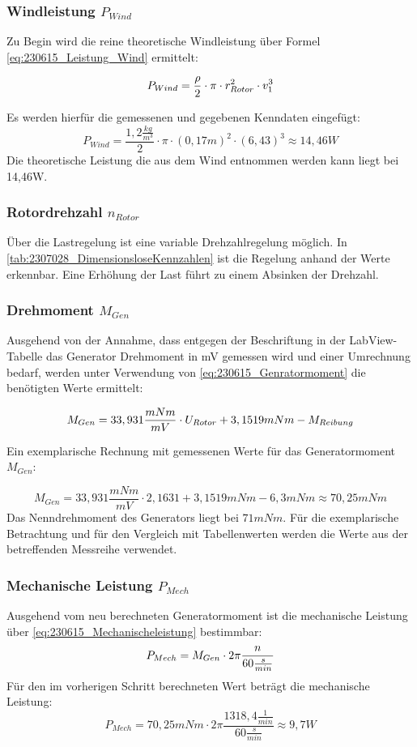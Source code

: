\subsubsection*{Windleistung $P_{Wind}$}
Zu Begin wird die reine theoretische Windleistung über Formel \autoref{eq:230615_Leistung_Wind} ermittelt:

\begin{equation}
    \centering
    P_{Wind} = \frac{\rho}{2} \cdot \pi \cdot r_{Rotor}^2 \cdot v_1^3
    \label{eq:230615_Leistung_Wind}
\end{equation}

Es werden hierfür die gemessenen und gegebenen Kenndaten eingefügt:
$$P_{Wind} = \frac{1,2 \frac{kg}{m^3}}{2} \cdot \pi \cdot (0,17 m)^2 \cdot (6,43)^3 \approx 14,46 W$$
Die theoretische Leistung die aus dem Wind entnommen werden kann liegt bei 14,46W.

\subsubsection*{Rotordrehzahl $n_{Rotor}$}
Über die Lastregelung ist eine variable Drehzahlregelung möglich. In \autoref{tab:2307028_DimensionsloseKennzahlen} ist die Regelung anhand der Werte erkennbar. Eine Erhöhung der Last führt zu einem Absinken der Drehzahl.
\subsubsection*{Drehmoment $M_{Gen}$}
Ausgehend von der Annahme,
 dass entgegen der Beschriftung in der LabView-Tabelle das Generator Drehmoment in mV gemessen wird und einer Umrechnung bedarf, 
 werden unter Verwendung von \autoref{eq:230615_Genratormoment} die benötigten Werte ermittelt:

\begin{equation}
    \centering
    M_{Gen} = 33,931\frac{mNm}{mV} \cdot U_{Rotor} + 3,1519 mNm - M_{Reibung}
    \label{eq:230615_Genratormoment}
\end{equation}

Ein exemplarische Rechnung mit gemessenen Werte für das Generatormoment $M_{Gen}$:

$$M_{Gen} = 33,931\frac{mNm}{mV} \cdot 2,1631 + 3,1519 mNm - 6,3mNm \approx 70,25 mNm$$
Das Nenndrehmoment des Generators liegt bei $71 mNm$. Für die exemplarische Betrachtung und für den Vergleich mit Tabellenwerten werden die Werte aus der betreffenden Messreihe verwendet.
\subsubsection*{Mechanische Leistung $P_{Mech}$}
Ausgehend vom neu berechneten Generatormoment ist die mechanische Leistung über \autoref{eq:230615_Mechanischeleistung} bestimmbar:
\begin{equation}
    \centering
    P_{Mech} = M_{Gen} \cdot 2 \pi \frac{n}{60\frac{s}{min}}
    \label{eq:230615_Mechanischeleistung}
\end{equation}
Für den im vorherigen Schritt berechneten Wert beträgt die mechanische Leistung: 
$$P_{Mech} = 70,25mNm \cdot 2 \pi \frac{1318,4 \frac{1}{min}}{60\frac{s}{min}} \approx 9,7W$$


